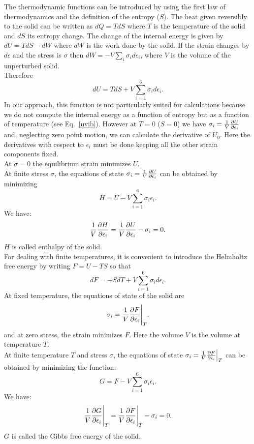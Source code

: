 \documentclass[12pt,a4paper,twoside]{report}
\begin{document}
The thermodynamic functions can be introduced by using the first law
of thermodynamics and the definition of the entropy ($S$). The heat 
given reversibly to the solid can be written as $dQ=TdS$ where $T$ is
the temperature of the solid and $dS$ its entropy change. The change 
of the internal energy is given by $dU = TdS - dW$ where $dW$ is 
the work done by the solid. If the strain changes by $d\epsilon$ and 
the stress is $\sigma$ then $dW=-V \sum_i \sigma_i d\epsilon_i$, where $V$
is the volume of the unperturbed solid. \\
Therefore
\begin{equation}
dU=TdS + V \sum_{i=1}^6 \sigma_i d\epsilon_i.
\end{equation}
In our approach, this function is not particularly suited for 
calculations because we do not compute the internal energy as a function 
of entropy but as a function of temperature (see Eq.~\ref{uvib}). However
at $T=0$ ($S=0$) we have $\sigma_i={1 \over V} 
{\partial U \over \partial \epsilon_i}$ and, neglecting zero point motion,
we can calculate the derivative of $U_0$. 
Here the derivatives with 
respect to $\epsilon_i$ must be done keeping all the other strain 
components fixed. \\
At $\sigma=0$ the equilibrium strain minimizes $U$. \\ 
At finite stress $\sigma$, 
the equations of state $\sigma_i ={1\over V} 
{\partial U \over \partial \epsilon_i}$
can be obtained by minimizing
\begin{equation}
H= U - V \sum_{i=1}^6 \sigma_i \epsilon_i.
\end{equation}
We have:
\begin{equation}
{1\over V }{\partial H \over \partial \epsilon_i} = {1\over V} 
{\partial U \over \partial \epsilon_i}- 
\sigma_i = 0.
\end{equation}
$H$ is called enthalpy of the solid. \\
For dealing with finite temperatures, it is convenient to introduce the 
Helmholtz free energy by writing $F=U-TS$ so that
\begin{equation}
dF=-S dT + V \sum_{i=1}^6 \sigma_i d\epsilon_i.
\end{equation}
At fixed temperature, the equations of state of the solid are
\begin{equation}
\sigma_i= {1\over V }{\partial F \over \partial \epsilon_i}\Bigg|_T.
\end{equation}
and at zero stress, the strain minimizes $F$.
Here the volume $V$ is the volume at temperature $T$. \\
At finite temperature $T$ and stress $\sigma$, the equations of state
 $\sigma_i={1\over V}
{\partial F\over \partial \epsilon_i}\Big|_T$ can be obtained by 
minimizing the function:
\begin{equation}
G= F - V \sum_{i=1}^6 \sigma_i \epsilon_i.
\end{equation}
We have:
\begin{equation}
{1\over V} {\partial G \over \partial \epsilon_i}\Bigg |_T = {1\over V} 
{\partial F \over \partial \epsilon_i}\Bigg |_T - \sigma_i = 0.
\end{equation}
$G$ is called the Gibbs free energy of the solid.
\end{document}
